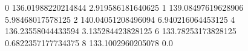 0 136.01988220214844 2.919586181640625
1 139.08497619628906 5.98468017578125
2 140.04051208496094 6.940216064453125
4 136.23558044433594 3.135284423828125
6 133.78253173828125 0.6822357177734375
8 133.1002960205078 0.0
